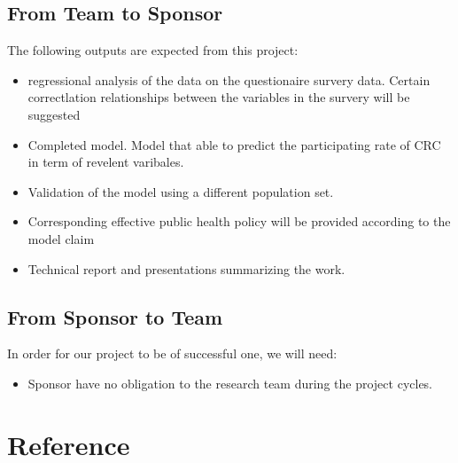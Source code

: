 \documentclass[12pt,letterpaper]{article}
\theoremstyle{definition}
\begin{document}
\subsection{From Team to Sponsor} %
The following outputs are expected from this project:
\begin{itemize}
    \item regressional analysis of the data on the questionaire survery data. 
        Certain correctlation relationships between the variables in the survery will be suggested 
    \item Completed model. Model that able to predict the participating rate of CRC in term of revelent varibales.
    \item Validation of the model using a different population set. 
    \item Corresponding effective public health policy will be provided according to the model claim
    \item Technical report and presentations summarizing the work. 
\end{itemize}

\subsection{From Sponsor to Team} %

In order for our project to be of successful one, we will need:
\begin{itemize}
    \item Sponsor have no obligation to the research team during the project cycles.
\end{itemize}

\section{Reference}

\nocite{*}

\end{document}
